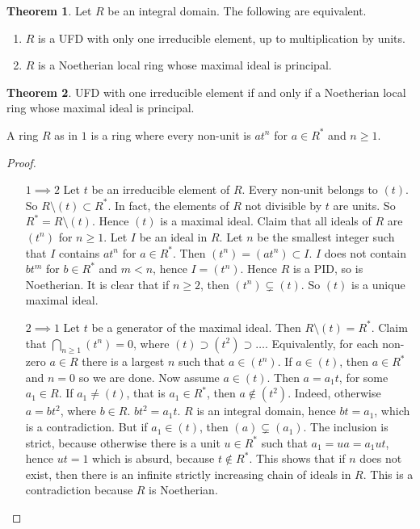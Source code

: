 \documentclass{article}
\newcommand{\rb}[1]{\left( #1 \right)}
\theoremstyle{definition}\newtheorem{definition}{Definition}[section]
\theoremstyle{definition}\newtheorem{remark}[definition]{Remark}
\theoremstyle{definition}\newtheorem*{example}{Example}
\theoremstyle{definition}\newtheorem*{note}{Note}
\newtheorem{theorem}[definition]{Theorem}
\begin{document}
\begin{theorem}
Let $ R $ be an integral domain. The following are equivalent.
\begin{enumerate}
\item $ R $ is a UFD with only one irreducible element, up to multiplication by units.
\item $ R $ is a Noetherian local ring whose maximal ideal is principal.
\end{enumerate}
\end{theorem}

\begin{theorem}
UFD with one irreducible element if and only if a Noetherian local ring whose maximal ideal is principal.
\end{theorem}

A ring $ R $ as in $ 1 $ is a ring where every non-unit is $ at^n $ for $ a \in R^* $ and $ n \ge 1 $.

\begin{proof}
\hfill
\begin{itemize}[leftmargin=0.5in]
\item[$ 1 \implies 2 $] Let $ t $ be an irreducible element of $ R $. Every non-unit belongs to $ \rb{t} $. So $ R \setminus \rb{t} \subset R^* $. In fact, the elements of $ R $ not divisible by $ t $ are units. So $ R^* = R \setminus \rb{t} $. Hence $ \rb{t} $ is a maximal ideal. Claim that all ideals of $ R $ are $ \rb{t^n} $ for $ n \ge 1 $. Let $ I $ be an ideal in $ R $. Let $ n $ be the smallest integer such that $ I $ contains $ at^n $ for $ a \in R^* $. Then $ \rb{t^n} = \rb{at^n} \subset I $. $ I $ does not contain $ bt^m $ for $ b \in R^* $ and $ m < n $, hence $ I = \rb{t^n} $. Hence $ R $ is a PID, so is Noetherian. It is clear that if $ n \ge 2 $, then $ \rb{t^n} \subsetneq \rb{t} $. So $ \rb{t} $ is a unique maximal ideal.
\item[$ 2 \implies 1 $] Let $ t $ be a generator of the maximal ideal. Then $ R \setminus \rb{t} = R^* $. Claim that $ \bigcap_{n \ge 1} \rb{t^n} = 0 $, where $ \rb{t} \supset \rb{t^2} \supset \dots $. Equivalently, for each non-zero $ a \in R $ there is a largest $ n $ such that $ a \in \rb{t^n} $. If $ a \in \rb{t} $, then $ a \in R^* $ and $ n = 0 $ so we are done. Now assume $ a \in \rb{t} $. Then $ a = a_1t $, for some $ a_1 \in R $. If $ a_1 \ne \rb{t} $, that is $ a_1 \in R^* $, then $ a \notin \rb{t^2} $. Indeed, otherwise $ a = bt^2 $, where $ b \in R $. $ bt^2 = a_1t $. $ R $ is an integral domain, hence $ bt = a_1 $, which is a contradiction. But if $ a_1 \in \rb{t} $, then $ \rb{a} \subsetneq \rb{a_1} $. The inclusion is strict, because otherwise there is a unit $ u \in R^* $ such that $ a_1 = ua = a_1ut $, hence $ ut = 1 $ which is absurd, because $ t \notin R^* $. This shows that if $ n $ does not exist, then there is an infinite strictly increasing chain of ideals in $ R $. This is a contradiction because $ R $ is Noetherian.
\end{itemize}
\end{proof}
\end{document}
